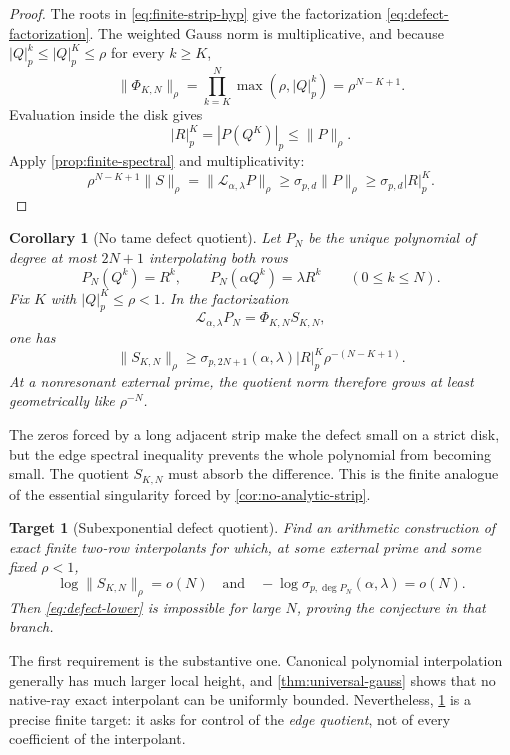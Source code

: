 \documentclass[11pt,oneside]{article}
\newtheorem{corollary}[theorem]{Corollary}
\newtheorem{target}[theorem]{Target}
\theoremstyle{definition}
\begin{document}
\begin{proof}
The roots in \eqref{eq:finite-strip-hyp} give the factorization
\eqref{eq:defect-factorization}.  The weighted Gauss norm is multiplicative, and because
$|Q|_p^k\le|Q|_p^K\le\rho$ for every $k\ge K$,
\begin{equation}\label{eq:Phi-norm}
 \lVert\Phi_{K,N}\rVert_\rho
 =\prod_{k=K}^{N}\max(\rho,|Q|_p^k)
 =\rho^{N-K+1}.
\end{equation}
Evaluation inside the disk gives
\[
 |R|_p^K=|P(Q^K)|_p\le\lVert P\rVert_\rho.
\]
Apply \cref{prop:finite-spectral} and multiplicativity:
\[
 \rho^{N-K+1}\lVert S\rVert_\rho
 =\lVert\mathcal L_{\alpha,\lambda}P\rVert_\rho
 \ge\sigma_{p,d}\lVert P\rVert_\rho
 \ge\sigma_{p,d}|R|_p^K.
\]
\end{proof}

\begin{corollary}[No tame defect quotient]\label{cor:no-tame-defect}
Let $P_N$ be the unique polynomial of degree at most $2N+1$ interpolating both rows
\[
 P_N(Q^k)=R^k,
 \qquad
 P_N(\alpha Q^k)=\lambda R^k
 \qquad(0\le k\le N).
\]
Fix $K$ with $|Q|_p^K\le\rho<1$.  In the factorization
\[
 \mathcal L_{\alpha,\lambda}P_N=\Phi_{K,N}S_{K,N},
\]
one has
\begin{equation}\label{eq:SKN-growth}
 \lVert S_{K,N}\rVert_\rho
 \ge
 \sigma_{p,2N+1}(\alpha,\lambda)
 |R|_p^K\rho^{-(N-K+1)}.
\end{equation}
At a nonresonant external prime, the quotient norm therefore grows at least geometrically
like $\rho^{-N}$.
\end{corollary}

The zeros forced by a long adjacent strip make the defect small on a strict disk, but the
edge spectral inequality prevents the whole polynomial from becoming small.  The quotient
$S_{K,N}$ must absorb the difference.  This is the finite analogue of the essential
singularity forced by \cref{cor:no-analytic-strip}.

\begin{target}[Subexponential defect quotient]\label{target:defect-quotient}
Find an arithmetic construction of exact finite two-row interpolants for which, at some
external prime and some fixed $\rho<1$,
\[
 \log\lVert S_{K,N}\rVert_\rho=o(N)
 \quad\text{and}\quad
 -\log\sigma_{p,\deg P_N}(\alpha,\lambda)=o(N).
\]
Then \eqref{eq:defect-lower} is impossible for large $N$, proving the conjecture in that
branch.
\end{target}

The first requirement is the substantive one.  Canonical polynomial interpolation generally
has much larger local height, and \cref{thm:universal-gauss} shows that no native-ray exact
interpolant can be uniformly bounded.  Nevertheless, \cref{target:defect-quotient} is a
precise finite target: it asks for control of the \emph{edge quotient}, not of every
coefficient of the interpolant.
\end{document}
